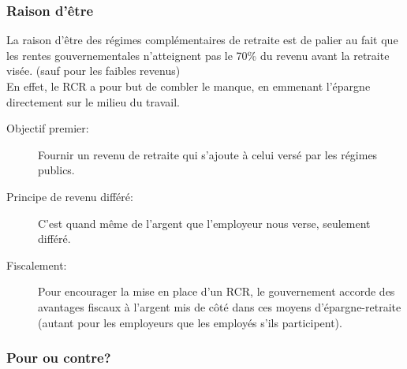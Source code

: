 \documentclass[10pt, french]{article}
\begin{document}
\begin{multicols*}{3}
\subsubsection*{Raison d'être}

La raison d'être des régimes complémentaires de retraite est de palier au fait que les rentes gouvernementales n'atteignent pas le 70\% du revenu avant la retraite visée. (sauf pour les faibles revenus)\\
En effet, le RCR a pour but de combler le manque, en emmenant l'épargne directement sur le milieu du travail.

\begin{description}
	\item[Objectif premier:] Fournir un revenu de retraite qui s'ajoute à celui versé par les régimes publics.
	\item[Principe de revenu différé:] C'est quand même de l'argent que l'employeur nous verse, seulement différé.
	\item[Fiscalement:] Pour encourager la mise en place d'un RCR, le gouvernement accorde des avantages fiscaux à l'argent mis de côté dans ces moyens d'épargne-retraite (autant pour les employeurs que les employés s'ils participent).
\end{description}

\subsubsection*{Pour ou contre?}


\end{multicols*}
\end{document}
